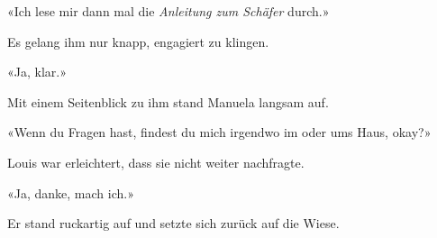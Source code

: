«Ich lese mir dann mal die \emph{Anleitung zum Schäfer} durch.»

Es gelang ihm nur knapp, engagiert zu klingen.

«Ja, klar.»

Mit einem Seitenblick zu ihm stand Manuela langsam auf.

«Wenn du Fragen hast, findest du mich irgendwo im oder ums Haus, okay?»

Louis war erleichtert, dass sie nicht weiter nachfragte.

«Ja, danke, mach ich.»

Er stand ruckartig auf und setzte sich zurück auf die Wiese.